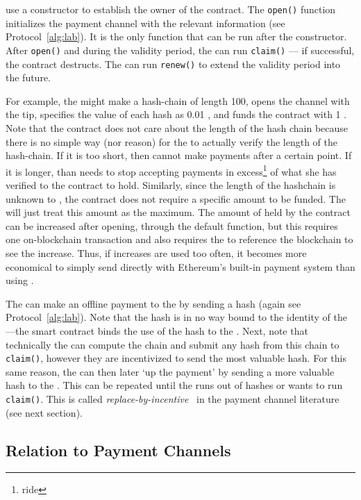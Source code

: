 \ew use a constructor to establish the owner of the contract. The \texttt{open()} function initializes the payment channel with the relevant information (see Protocol~\ref{alg:lab}). It is the only function that can be run after the constructor. After \texttt{open()} and during the validity period, the \take can run \texttt{claim()} --- if successful, the contract destructs. The \make can run \texttt{renew()} to extend the validity period into the future. 

For example, the \make might make a hash-chain of length 100, opens the channel with the tip, specifies the value of each hash as 0.01 \eth, and funds the contract with 1 \eth. Note that the contract does not care about the length of the hash chain because there is no simple way (nor reason) for the \take to actually verify the length of the hash-chain. If it is too short, then \make cannot make payments after a certain point. If it is longer, than \take needs to stop accepting payments in excess\footnote{ride} of what she has verified to the contract to hold. Similarly, since the length of the hashchain is unknown to \take, the contract does not require a specific amount to be funded. The \take will just treat this amount as the maximum. The amount of \eth held by the contract can be increased after opening, through the default function, but this requires one on-blockchain transaction and also requires the \take to reference the blockchain to see the increase. Thus, if increases are used too often, it becomes more economical to simply send \eth directly with Ethereum's built-in payment system than using \ew.

The \make can make an offline payment to the \take by sending a hash (again see Protocol~\ref{alg:lab}). Note that the hash is in no way bound to the identity of the \take---the smart contract binds the use of the hash to the \take. Next, note that technically the \take can compute the chain and submit any hash from this chain to \texttt{claim()}, however they are incentivized to send the most valuable hash. For this same reason, the \make can then later `up the payment' by sending a more valuable hash to the \take. This can be repeated until the \make runs out of hashes or \take wants to run \texttt{claim()}. This is called \textit{replace-by-incentive}~\cite{MMSH16} in the payment channel literature (see next section).

\subsection{Relation to Payment Channels}
\label{sec:pcn}

